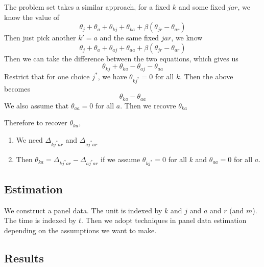 \documentclass[12pt]{article}[margin=1in]
\begin{document}
The problem set takes a similar approach, for a fixed $k$ and some fixed $jar$, we know the value of
$$ \theta_{j} + \theta_{a} + \theta_{kj} + \theta_{ka} + \beta(\theta_{jr} - \theta_{ar})$$
Then just pick another $k'= a$ and the same fixed $jar$, we know 
$$ \theta_{j} + \theta_{a} + \theta_{aj} + \theta_{aa} + \beta(\theta_{jr} - \theta_{ar})$$
Then we can take the difference between the two equations, which gives us
$$ \theta_{kj} + \theta_{ka} - \theta_{aj} - \theta_{aa} $$
Restrict that for one choice $j^*$, we have $\theta_{kj^*} = 0$ for all $k$. Then the above becomes $$ \theta_{ka} - \theta_{aa}$$
We also assume that $\theta_{aa} = 0$ for all $a$. Then we recovre $ \theta_{ka}$

Therefore to recover $\theta_{ka}$, 
\begin{enumerate}
    \item We need $\Delta_{kj^*ar}$ and $\Delta_{aj^*ar}$
    \item Then $\theta_{ka} = \Delta_{kj^*ar} - \Delta_{aj^*ar}$ if we assume $\theta_{kj^*} = 0$ for all $k$ and $\theta_{aa} = 0$ for all $a$.
\end{enumerate}

\subsection{Estimation}
We construct a panel data. The unit is indexed by $k$ and $j$ and $a$ and $r$ (and $m$). The time is indexed by $t$. Then we adopt techniques in panel data estimation depending on the assumptions we want to make. 


\subsection{Results}
\end{document}
